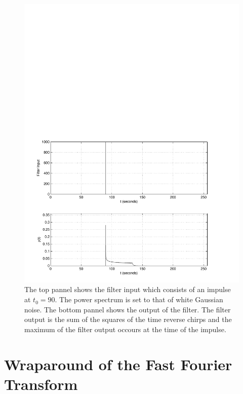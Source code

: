 \begin{figure}[htb]
\label{f:impuse_snr}
\begin{center}
\includegraphics[width=\linewidth]{figures/findchirp/impulse_snr}
\end{center}
\caption{%
The top pannel shows the filter input which consists of an impulse at $t_0 = 90$.
The power spectrum is set to that of white Gaussian noise. The bottom pannel
shows the output of the filter. The filter output is the sum of the squares of
the time reverse chirps and the maximum of the filter output occours at the
time of the impulse.
}
\end{figure}

\section{Wraparound of the Fast Fourier Transform}
\label{s:wraparound}

